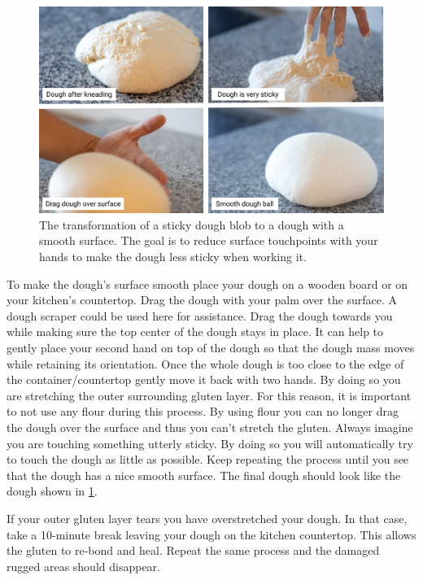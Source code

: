 \begin{figure}[!htb]
  \includegraphics[width=\textwidth]{dough-ball-steps}
  \caption{The transformation of a sticky dough blob to a dough
  with a smooth surface. The goal is to reduce surface touchpoints
  with your hands to make the dough less sticky when working it.
  }
  \label{fig:dough-ball-steps}
\end{figure}


To make the dough's surface smooth place your dough on a wooden board or
on your kitchen's countertop. Drag the dough with your palm over the surface.
A dough scraper could be used here for assistance.
Drag the dough towards you while making sure the top center of the dough stays in place.
It can help to gently place your second hand on top of the dough so that
the dough mass moves while retaining its orientation. Once the whole dough
is too close to the edge of the container/countertop gently move it back
with two hands. By doing so you are stretching the outer surrounding gluten layer.
For this reason, it is important to not use any flour during this process.
By using flour you can no longer drag the dough over the surface and thus
you can't stretch the gluten. Always imagine you are touching something utterly sticky.
By doing so you will automatically try to touch the dough as little
as possible. Keep repeating the process until you see that the dough
has a nice smooth surface. The final dough should look like the dough
shown in \ref{fig:dough-ball-steps}.

If your outer gluten layer tears you have overstretched your dough. In
that case, take a 10-minute break leaving your dough on the kitchen countertop. 
This allows the gluten to re-bond and heal. Repeat the same process
and the damaged rugged areas should disappear.

